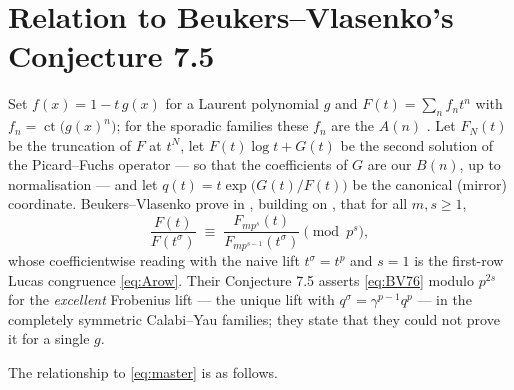 \documentclass[11pt,reqno]{amsart}
\theoremstyle{plain}
\theoremstyle{definition}
\theoremstyle{remark}
\DeclareMathOperator{\ct}{ct}
\numberwithin{equation}{section}
\begin{document}
\section{Relation to Beukers--Vlasenko's Conjecture 7.5}\label{sec:BV}

Set $f(x)=1-t\,g(x)$ for a Laurent polynomial $g$ and $F(t)=\sum_nf_nt^n$ with
$f_n=\ct\bigl(g(x)^n\bigr)$; for the sporadic families these $f_n$ are the $A(n)$
\cite{Gorodetsky,Straub2301}. Let $F_N(t)$ be the truncation of $F$ at $t^N$, let
$F(t)\log t+G(t)$ be the second solution of the Picard--Fuchs operator --- so that the
coefficients of $G$ are our $B(n)$, up to normalisation --- and let
$q(t)=t\exp\bigl(G(t)/F(t)\bigr)$ be the canonical (mirror) coordinate. Beukers--Vlasenko
prove in \cite[\S7]{BVthree}, building on \cite{BVtwo}, that for all $m,s\ge1$,
\begin{equation}\label{eq:BV76}
  \frac{F(t)}{F(t^\sigma)}\;\equiv\;\frac{F_{mp^s}(t)}{F_{mp^{s-1}}(t^\sigma)}\pmod{p^s},
\end{equation}
whose coefficientwise reading with the naive lift $t^\sigma=t^p$ and $s=1$ is the first-row
Lucas congruence \eqref{eq:Arow}. Their Conjecture 7.5 asserts \eqref{eq:BV76} modulo
$p^{2s}$ for the \emph{excellent} Frobenius lift --- the unique lift with
$q^{\sigma}=\gamma^{p-1}q^{p}$ --- in the completely symmetric Calabi--Yau families; they
state that they could not prove it for a single $g$.

The relationship to \eqref{eq:master} is as follows.
\end{document}
